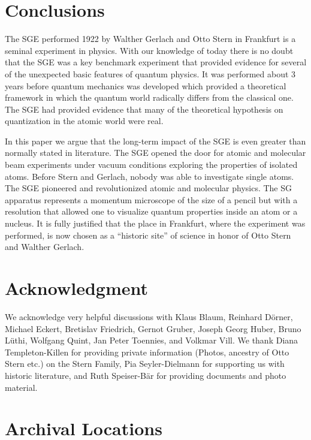 \documentclass{article}
\begin{document}
\section{Conclusions}

The SGE performed 1922 by Walther Gerlach and Otto Stern in Frankfurt is a seminal experiment in physics. With our knowledge of today there is no doubt that the SGE was a key benchmark experiment that provided evidence for several of the unexpected basic features of quantum physics. It was performed about 3 years before quantum mechanics was developed which provided a theoretical framework in which the quantum world radically differs from the classical one. The SGE had provided evidence that many of the theoretical hypothesis on quantization in the atomic world were real. 

In this paper we argue that the long-term impact of the SGE is even greater than normally stated in literature. The SGE opened the door for atomic and molecular beam experiments under vacuum conditions exploring the properties of isolated atoms. Before Stern and Gerlach, nobody was able to investigate single atoms. The SGE pioneered and revolutionized atomic and molecular physics. The SG apparatus represents a momentum microscope of the size of a pencil but with a resolution that allowed one to visualize quantum properties inside an atom or a nucleus. It is fully justified that the place in Frankfurt, where the experiment was performed, is now chosen as a ``historic site'' of science in honor of Otto Stern and Walther Gerlach. 

\section*{Acknowledgment}

We acknowledge very helpful discussions with Klaus Blaum, Reinhard Dörner, Michael Eckert, Bretislav Friedrich, Gernot Gruber, Joseph Georg Huber, Bruno Lüthi, Wolfgang Quint, Jan Peter Toennies, and Volkmar Vill. We thank Diana Templeton-Killen for providing private information (Photos, ancestry of Otto Stern etc.) on the Stern Family, Pia Seyler-Dielmann for supporting us with historic literature, and Ruth Speiser-Bär for providing documents and photo material.

\section*{Archival Locations}
\end{document}
